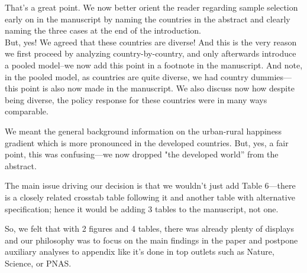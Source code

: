 That's a great point. We now better orient the reader regarding sample selection early on in the manuscript by naming the countries in the abstract and clearly naming the three cases at the end of the introduction.\\

But, yes! We agreed that these countries are diverse! And this is the very reason we first proceed by analyzing country-by-country, and only afterwards introduce a pooled model--we now add this point in a footnote in the manuscript. And note, in the pooled model, as countries are quite diverse, we had country dummies---this point is also now made in the manuscript. We also discuss now how despite being diverse, the policy response for these countries were in many ways comparable.  


We meant the general background information on the urban-rural happiness gradient which is more pronounced in the developed countries. But, yes, a fair point, this was confusing---we now dropped "the developed world'' from the abstract.\\


The main issue driving our decision is that we wouldn't just add Table 6---there is a closely related crosstab table following it and another table with alternative specification; hence it would be adding 3 tables to the manuscript, not one. 

So, we felt that with 2 figures and 4 tables, there was already plenty of displays and our philosophy was to focus on the main findings in the paper and postpone auxiliary analyses to appendix like it's done in top outlets such as Nature, Science, or PNAS.\\

